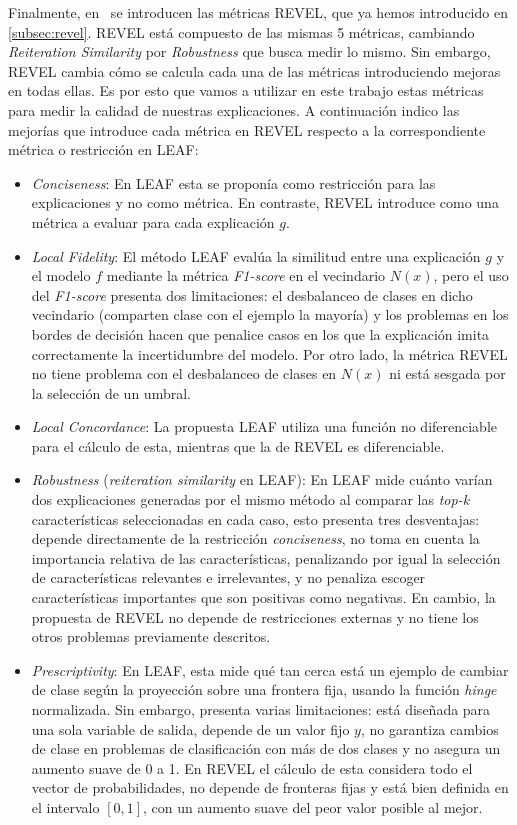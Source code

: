 Finalmente, en~\cite{REVEL} se introducen las métricas REVEL, que ya hemos introducido en \ref{subsec:revel}. REVEL está compuesto de las mismas 5 métricas, cambiando \textit{Reiteration Similarity} por \textit{Robustness} que busca medir lo mismo. Sin embargo, REVEL cambia cómo se calcula cada una de las métricas introduciendo mejoras en todas ellas. Es por esto que vamos a utilizar en este trabajo estas métricas para medir la calidad de nuestras explicaciones. A continuación indico las mejorías que introduce cada métrica en REVEL respecto a la correspondiente métrica o restricción en LEAF:
\begin{itemize}
\item \textit{Conciseness}:  En LEAF esta se proponía como restricción para las explicaciones y no como métrica. En contraste, REVEL introduce como una métrica a evaluar para cada explicación $g$.
\item \textit{Local Fidelity}:  El método LEAF evalúa la similitud entre una explicación $g$ y el modelo $f$ mediante la métrica \textit{F1-score} en el vecindario $N(x)$, pero el uso del \textit{F1-score} presenta dos limitaciones: el desbalanceo de clases en dicho vecindario (comparten clase con el ejemplo la mayoría) y los problemas en los bordes de decisión hacen que penalice casos en los que la explicación imita correctamente la incertidumbre del modelo. Por otro lado, la métrica REVEL no tiene problema con el desbalanceo de clases en $N(x)$ ni está sesgada por la selección de un umbral.
\item \textit{Local Concordance}: La propuesta LEAF utiliza una función no diferenciable para el cálculo de esta, mientras que la de REVEL es diferenciable. 
\item \textit{Robustness} (\textit{reiteration similarity} en LEAF): En LEAF mide cuánto varían dos explicaciones generadas por el mismo método al comparar las \textit{top-k} características seleccionadas en cada caso, esto presenta tres desventajas: depende directamente de la restricción \textit{conciseness}, no toma en cuenta la importancia relativa de las características, penalizando por igual la selección de características relevantes e irrelevantes, y no penaliza escoger características importantes que son positivas como negativas. En cambio, la propuesta de REVEL no depende de restricciones externas y no tiene los otros problemas previamente descritos.
\item \textit{Prescriptivity}: En LEAF, esta mide qué tan cerca está un ejemplo de cambiar de clase según la proyección sobre una frontera fija, usando la función \textit{hinge} normalizada. Sin embargo, presenta varias limitaciones: está diseñada para una sola variable de salida, depende de un valor fijo $y$, no garantiza cambios de clase en problemas de clasificación con más de dos clases y no asegura un aumento suave de 0 a 1. En REVEL el cálculo de esta considera todo el vector de probabilidades, no depende de fronteras fijas y está bien definida en el intervalo $[0,1]$, con un aumento suave del peor valor posible al mejor. 
\end{itemize}



